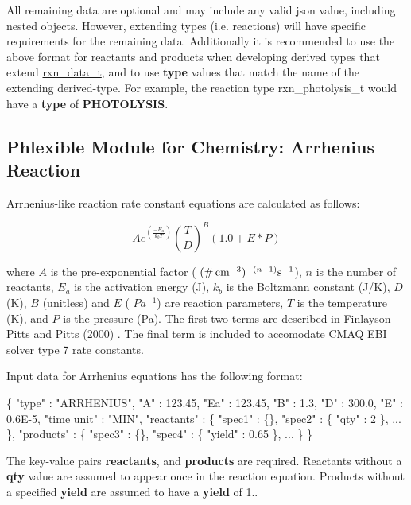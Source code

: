 All remaining data are optional and may include any valid {\ttfamily json} value, including nested objects. However, extending types (i.\+e. reactions) will have specific requirements for the remaining data. Additionally it is recommended to use the above format for reactants and products when developing derived types that extend {\ttfamily \mbox{\hyperlink{structpmc__rxn__data_1_1rxn__data__t}{rxn\+\_\+data\+\_\+t}}}, and to use {\bfseries type} values that match the name of the extending derived-\/type. For example, the reaction type {\ttfamily rxn\+\_\+photolysis\+\_\+t} would have a {\bfseries type} of {\bfseries P\+H\+O\+T\+O\+L\+Y\+S\+IS}. \hypertarget{phlex_rxn_arrhenius}{}\subsection{Phlexible Module for Chemistry\+: Arrhenius Reaction}\label{phlex_rxn_arrhenius}
Arrhenius-\/like reaction rate constant equations are calculated as follows\+:

\[ Ae^{(\frac{-E_a}{k_bT})}(\frac{T}{D})^B(1.0+E*P) \]

where $A$ is the pre-\/exponential factor ( $(\mbox{\si{\#.cm^{-3}}})^{-(n-1)}\mbox{\si{\per\second}}$), $n$ is the number of reactants, $E_a$ is the activation energy (J), $k_b$ is the Boltzmann constant (J/K), $D$ (K), $B$ (unitless) and $E$ ( $Pa^{-1}$) are reaction parameters, $T$ is the temperature (K), and $P$ is the pressure (Pa). The first two terms are described in Finlayson-\/\+Pitts and Pitts (2000) \cite{Finlayson-Pitts2000} . The final term is included to accomodate C\+M\+AQ E\+BI solver type 7 rate constants.

Input data for Arrhenius equations has the following format\+: 
\begin{DoxyCode}
\{
  "type" : "ARRHENIUS",
  "A" : 123.45,
  "Ea" : 123.45,
  "B"  : 1.3,
  "D"  : 300.0,
  "E"  : 0.6E-5,
  "time unit" : "MIN",
  "reactants" : \{
    "spec1" : \{\},
    "spec2" : \{ "qty" : 2 \},
    ...
  \},
  "products" : \{
    "spec3" : \{\},
    "spec4" : \{ "yield" : 0.65 \},
    ...
  \}
\}
\end{DoxyCode}
 The key-\/value pairs {\bfseries reactants}, and {\bfseries products} are required. Reactants without a {\bfseries qty} value are assumed to appear once in the reaction equation. Products without a specified {\bfseries yield} are assumed to have a {\bfseries yield} of 1..

